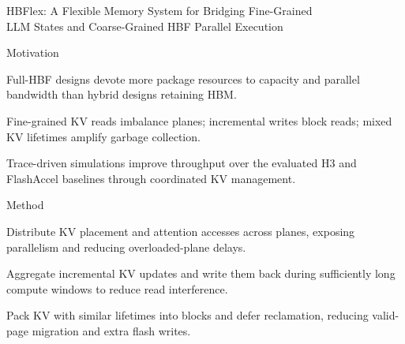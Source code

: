 \begin{frame}[t]{HBFlex: A Flexible Memory System for Bridging Fine-Grained\\LLM States and Coarse-Grained HBF Parallel Execution}
\vspace{.02cm}
\begin{minipage}[t][3.25cm][t]{\linewidth}
\begin{summarysection}{Motivation}
\item {} Full-HBF designs devote more package resources to capacity and parallel bandwidth than hybrid designs retaining HBM.
\item {} Fine-grained KV reads imbalance planes; incremental writes block reads; mixed KV lifetimes amplify garbage collection.
\item {} Trace-driven simulations improve throughput over the evaluated H3 and FlashAccel baselines through coordinated KV management.
\end{summarysection}
\end{minipage}
\vspace{.18cm}
\begin{summarysection}{Method}
\item {} Distribute KV placement and attention accesses across planes, exposing parallelism and reducing overloaded-plane delays.
\item {} Aggregate incremental KV updates and write them back during sufficiently long compute windows to reduce read interference.
\item {} Pack KV with similar lifetimes into blocks and defer reclamation, reducing valid-page migration and extra flash writes.
\end{summarysection}
\end{frame}
